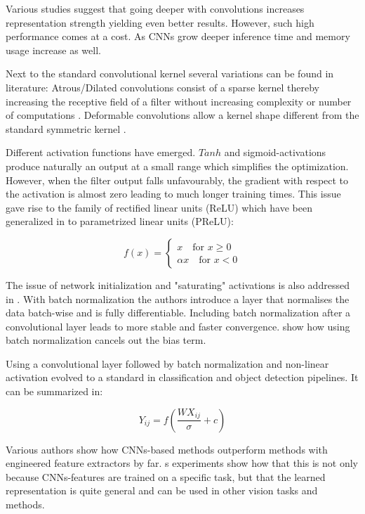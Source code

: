 	Various studies suggest that going deeper with convolutions increases representation strength yielding even better results. However, such high performance comes at a cost. As \acp{CNN} grow deeper inference time and memory usage increase as well.
	
	Next to the standard convolutional kernel several variations can be found in literature: Atrous/Dilated convolutions consist of a sparse kernel thereby increasing the receptive field of a filter without increasing complexity or number of computations . Deformable convolutions allow a kernel shape different from the standard symmetric kernel .
	
	Different activation functions have emerged. $Tanh$ and sigmoid-activations produce naturally an output at a small range which simplifies the optimization. However, when the filter output falls unfavourably, the gradient with respect to the activation is almost zero leading to much longer training times. This issue gave rise to the family of rectified linear units (ReLU) which have been generalized in  to parametrized linear units (PReLU):
	
	$$
	f(x) = \begin{cases}
	x \quad \text{for } x \geq 0 \\
	\alpha x \quad \text{for } x < 0
	\end{cases}
	$$
	
	The issue of network initialization and "saturating" activations is also addressed in \cite{Ioffe2015}. With batch normalization the authors introduce a layer that normalises the data batch-wise and is fully differentiable. Including batch normalization after a convolutional layer leads to more stable and faster convergence.  show how using batch normalization cancels out the bias term.
	
	Using a convolutional layer followed by batch normalization and non-linear activation evolved to a standard in classification and object detection pipelines. It can be summarized in:
	
	$$
	Y_{ij} = f(\frac{WX_{ij}}{\sigma}+c)
	$$
	
	
	
	
	Various authors show how \acp{CNN}-based methods outperform methods with engineered feature extractors by far. \cite{Razavian}s experiments show how that this is not only because \acp{CNN}-features are trained on a specific task, but that  the learned representation is quite general and can be used in other vision tasks and methods.
	
